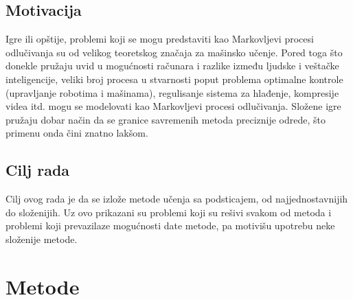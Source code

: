 \documentclass[a4paper,fleqn,12pt]{JMThesis}
\theoremstyle{plain}
\theoremstyle{definition}
\theoremstyle{definition}
\begin{document}
\section[Motivacija]{Motivacija}
Igre ili opštije, problemi koji se mogu predstaviti kao Markovljevi procesi odlučivanja su od velikog teoretskog značaja za mašinsko učenje. Pored toga što donekle pružaju uvid u mogućnosti računara i razlike između ljudske i veštačke inteligencije, veliki broj procesa u stvarnosti poput problema optimalne kontrole (upravljanje robotima i mašinama), regulisanje sistema za hlađenje, kompresije videa itd. mogu se modelovati kao Markovljevi procesi odlučivanja. Složene igre pružaju dobar način da se granice savremenih metoda preciznije odrede, što primenu onda čini znatno lakšom. 
\section [Cilj Rada]{Cilj rada}
Cilj ovog rada je da se izlože metode učenja sa podsticajem, od najjednostavnijih do složenijih. Uz ovo prikazani su problemi koji su rešivi svakom od metoda i problemi koji prevazilaze mogućnosti date metode, pa motivišu upotrebu neke složenije metode.

\chapter[Metode]{Metode}
\end{document}

